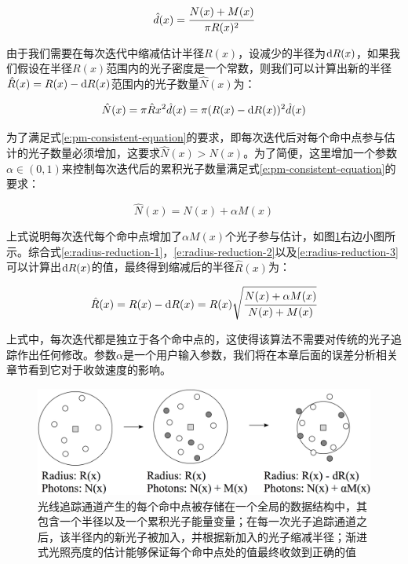 \begin{equation}\label{e:radius-reduction-1}
	\hat{d}(x)= \cfrac{N(x)+M(x)}{\pi R(x)^{2}}
\end{equation}

由于我们需要在每次迭代中缩减估计半径$R(x)$，设减少的半径为${\rm d}R(x)$，如果我们假设在半径$R(x)$范围内的光子密度是一个常数，则我们可以计算出新的半径$\hat{R}(x)=R(x)-{\rm d}R(x)$范围内的光子数量$\hat{N}(x)$为：

\begin{equation}\label{e:radius-reduction-2}
	\hat{N}(x)=\pi\hat{R}{x}^{2}\hat{d}(x)=\pi (R(x)-{\rm d}R(x))^{2}\hat{d}(x)
\end{equation}

为了满足式\ref{e:pm-consistent-equation}的要求，即每次迭代后对每个命中点参与估计的光子数量必须增加，这要求$\hat{N}(x)>N(x)$。为了简便，这里增加一个参数$\alpha \in (0, 1)$来控制每次迭代后的累积光子数量满足式\ref{e:pm-consistent-equation}的要求：

\begin{equation}\label{e:radius-reduction-3}
	\hat{N}(x)=N(x)+\alpha M(x)
\end{equation}

上式说明每次迭代每个命中点增加了$\alpha M(x)$个光子参与估计，如图\ref{f:pm-radius-reduction}右边小图所示。综合式\ref{e:radius-reduction-1}，\ref{e:radius-reduction-2}以及\ref{e:radius-reduction-3}可以计算出${\rm d}R(x)$的值，最终得到缩减后的半径$\hat{R}(x)$为：

\begin{equation}
	\hat{R}(x)=R(x)-{\rm d}R(x)=R(x)\sqrt{ \cfrac{N(x)+\alpha M(x)}{N(x)+M(x)}}
\end{equation}

上式中，每次迭代都是独立于各个命中点的，这使得该算法不需要对传统的光子追踪作出任何修改。参数$\alpha$是一个用户输入参数，我们将在本章后面的误差分析相关章节看到它对于收敛速度的影响。


\begin{figure}
	\begin{center}
		\includegraphics[width=\textwidth]{figures/pm/pm-19}
	\end{center}
	\caption{光线追踪通道产生的每个命中点被存储在一个全局的数据结构中，其包含一个半径以及一个累积光子能量变量；在每一次光子追踪通道之后，该半径内的新光子被加入，并根据新加入的光子缩减半径；渐进式光照亮度的估计能够保证每个命中点处的值最终收敛到正确的值}
	\label{f:pm-radius-reduction}
\end{figure}







